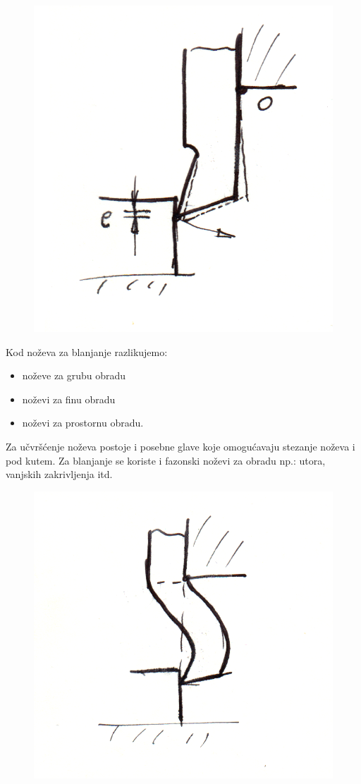 \documentclass[a4paper,12pt]{article}
\numberwithin{figure}{section}
\begin{document}
\begin{figure}[!h]
\centering
\includegraphics[scale=0.15]{image_16-2.png}
\end{figure}
\FloatBarrier
Kod noževa za blanjanje razlikujemo:
\begin{itemize}
\item noževe za grubu obradu
\item noževi za finu obradu
\item noževi za prostornu obradu.
\end{itemize}
Za učvršćenje noževa postoje i posebne glave koje omogućavaju stezanje noževa i pod kutem. Za blanjanje se koriste i fazonski noževi za obradu np.: utora, vanjskih zakrivljenja itd.
\begin{figure}[!h]
\centering
\includegraphics[scale=0.15]{image_16-3.png}
\end{figure}
\end{document}
